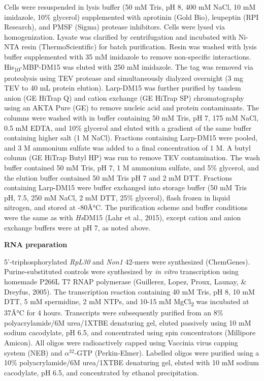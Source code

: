 \documentclass[12pt,oneside]{reedthesis}
\begin{document}
Cells were resuspended in lysis buffer (50 mM Tris, pH 8, 400 mM NaCl,
10 mM imidazole, 10\% glycerol) supplemented with aprotinin (Gold Bio),
leupeptin (RPI Research), and PMSF (Sigma) protease inhibitors. Cells
were lysed via homogenization. Lysate was clarified by centrifugation
and incubated with Ni-NTA resin (ThermoScientific) for batch
purification. Resin was washed with lysis buffer supplemented with 35 mM
imidazole to remove non-specific interactions. His\textsubscript{10}-MBP-DM15 was
eluted with 250 mM imidazole. The tag was removed via proteolysis using
TEV protease and simultaneously dialyzed overnight (3 mg TEV to 40 mL
protein elution). Larp-DM15 was further purified by tandem anion (GE
HiTrap Q) and cation exchange (GE HiTrap SP) chromatography using an
AKTA Pure (GE) to remove nucleic acid and protein contaminants. The
columns were washed with in buffer containing 50 mM Tris, pH 7, 175 mM
NaCl, 0.5 mM EDTA, and 10\% glycerol and eluted with a gradient of the
same buffer containing higher salt (1 M NaCl). Fractions containing
Larp-DM15 were pooled, and 3 M ammonium sulfate was added to a final
concentration of 1 M. A butyl column (GE HiTrap Butyl HP) was run to
remove TEV contamination. The wash buffer contained 50 mM Tris, pH 7, 1
M ammonium sulfate, and 5\% glycerol, and the elution buffer contained 50
mM Tris pH 7 and 2 mM DTT. Fractions containing Larp-DM15 were buffer
exchanged into storage buffer (50 mM Tris pH, 7.5, 250 mM NaCl, 2 mM
DTT, 25\% glycerol), flash frozen in liquid nitrogen, and stored at
-80Â°C. The purification scheme and buffer conditions were the same as
with \emph{Hs}DM15 (Lahr et al., 2015), except cation and
anion exchange buffers were at pH 7, as noted above.

\textbf{RNA preparation}

5'-triphosphorylated \emph{RpL30} and \emph{Non1} 42-mers were synthesized
(ChemGenes). Purine-substituted controls were synthesized by \emph{in vitro}
transcription using homemade P266L T7 RNAP polymerase
(Guillerez, Lopez, Proux, Launay, \& Dreyfus, 2005). The transcription reaction containing
40 mM Tris, pH 8, 10 mM DTT, 5 mM spermidine, 2 mM NTPs, and 10-15 mM
MgCl\textsubscript{2} was incubated at 37Â°C for 4 hours. Transcripts were subsequently
purified from an 8\% polyacrylamide/6M urea/1XTBE denaturing gel, eluted
passively using 10 mM sodium cacodylate, pH 6.5, and concentrated using
spin concentrators (Millipore Amicon). All oligos were radioactively
capped using Vaccinia virus capping system (NEB) and \(\alpha^{32}\)-GTP
(Perkin-Elmer). Labelled oligos were purified using a 10\%
polyacrylamide/6M urea/1XTBE denaturing gel, eluted with 10 mM sodium
cacodylate, pH 6.5, and concentrated by ethanol precipitation.
\end{document}
